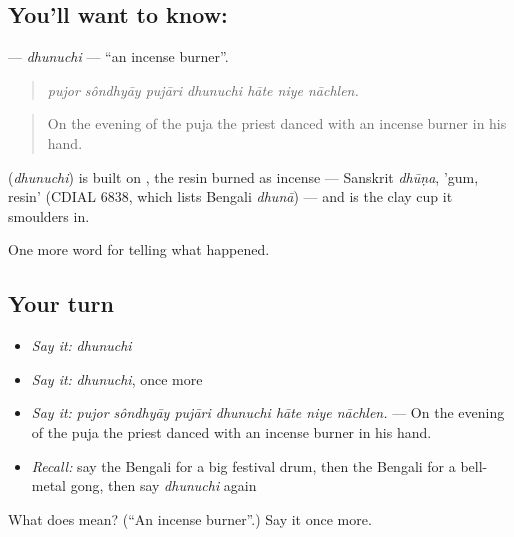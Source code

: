 \subsection*{You'll want to know: }
\textbf{} — \emph{dhunuchi} — \textquotedblleft{}an incense burner\textquotedblright{}.

\begin{quote}
      
\end{quote}

\begin{quote}
\emph{pujor sôndhyāy pujāri dhunuchi hāte niye nāchlen.}
\end{quote}

\begin{quote}
On the evening of the puja the priest danced with an incense burner in his hand.
\end{quote}

\begin{cousinweb}
\textbf{} (\emph{dhunuchi}) is built on , the resin burned as incense — Sanskrit \emph{dhūṇa}, 'gum, resin' (CDIAL 6838, which lists Bengali \emph{dhunā}) — and is the clay cup it smoulders in.
\end{cousinweb}

\begin{grammarlens}[title={What you've built}]
One more word for telling what happened.
\end{grammarlens}

\subsection*{Your turn}
\begin{itemize}
\raggedright
  \item \emph{Say it:} \emph{dhunuchi}
  \item \emph{Say it:} \emph{dhunuchi}, once more
  \item \emph{Say it:} \emph{pujor sôndhyāy pujāri dhunuchi hāte niye nāchlen.} — On the evening of the puja the priest danced with an incense burner in his hand.
  \item \emph{Recall:} say the Bengali for a big festival drum, then the Bengali for a bell-metal gong, then say \emph{dhunuchi} again
\end{itemize}

\begin{tcolorbox}[breakable,colback=teal!4,colframe=teal!35!black,title={Before you move on}]
What does  mean? (\textquotedblleft{}An incense burner\textquotedblright{}.) Say it once more.
\end{tcolorbox}
